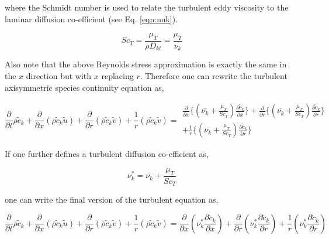 	where the Schmidt number is used to relate the turbulent eddy viscosity to the laminar diffusion
co-efficient (see Eq. \ref{eqn:nuk}).  

\begin{equation}
	Sc_T = \frac{\mu_T}{\rho D_{kl}} = \frac{\mu_T}{\nu_k}
\label{eqn:schmidt}
\end{equation} 

	Also note that the above Reynolds stress approximation is exactly the same in the $x$ direction 
but with $x$ replacing $r$.  Therefore one can rewrite the turbulent axisymmetric species continuity equation as,

\begin{displaymath}
	\frac{\partial}{\partial t}\overline{\rho}\tilde c_k + \frac{\partial}{\partial x}
	(\overline{\rho}\tilde c_k\tilde{u})  + \frac{\partial}{\partial r}
	(\overline{\rho}\tilde c_k\tilde{v})	+ \frac{1}{r}
	(\overline{\rho}\tilde c_k\tilde{v}) = 
	\begin{array}{c}
		\frac{\partial}{\partial x}\Big\{(\overline{\nu_k} + \frac{\mu_T}{Sc_T})
		\frac{\partial \tilde c_k}{\partial x}\Big\} +
		\frac{\partial}{\partial r} \Big\{(\overline{\nu_k} + \frac{\mu_T}{Sc_T})
		\frac{\partial \tilde c_k}{\partial r}\Big\} \\
		+ \frac{1}{r}\Big\{(\overline{\nu_k} + \frac{\mu_T}{Sc_T})\frac{\partial \tilde c_k}{\partial r}\Big\}
	\end{array}
\end{displaymath}

	If one further defines a turbulent diffusion co-efficient as,

\begin{equation}
	\nu_k^* = \overline{\nu_k} + \frac{\mu_T}{Sc_T}
\label{eqn:nukstar} 
\end{equation}

	one can write the final version of the turbulent equation as,

\begin{equation}
	\frac{\partial}{\partial t}\overline{\rho}\tilde c_k + \frac{\partial}{\partial x}
	(\overline{\rho}\tilde c_k\tilde{u})  + \frac{\partial}{\partial r}
	(\overline{\rho}\tilde c_k\tilde{v})	+ \frac{1}{r}
	(\overline{\rho}\tilde c_k\tilde{v}) = \frac{\partial}{\partial x}(
	\nu_k^*\frac{\partial \tilde c_k}{\partial x}) +
	\frac{\partial}{\partial r} (\nu_k^*\frac{\partial \tilde c_k}{\partial r})
	+ \frac{1}{r}(\nu_k^*\frac{\partial \tilde c_k}{\partial r})
\label{eqn:turbspeciesfinal}
\end{equation}

